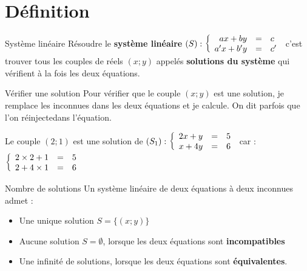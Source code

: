 \documentclass[10pt,a4paper,openany,twoside, eleve]{book}
\begin{document}
\chapnumber{} %
\entetegal{}


\vspace{-5mm}
\section{Définition}

\begin{defi}{Système linéaire}{}
Résoudre le \textbf{système linéaire} $(S) : \left\{\begin{array}{rcl} ax+by&=&c \\ a'x+b'y&=&c' \end{array}\right.$ c'est trouver tous les couples de réels $(x;y)$ appelés \textbf{solutions du système} qui vérifient à la fois les deux équations.
\end{defi}

\begin{methode}{Vérifier une solution}{}
   Pour vérifier que le couple $(x;y)$ est une solution, je remplace les inconnues dans les deux équations et je calcule. On dit parfois que l'on \og réinjecte\fg dans l'équation.
\end{methode}

\begin{ex}{}{}
   Le couple $(2;1)$ est une solution de $(S_1) : \left\{\begin{array}{rcl} 2x+y&=&5 \\ x+4y&=&6 \end{array}\right.$ car :  \quad $\left\{\begin{array}{rcl} 2\times2+1&=&5 \\ 2+4\times1&=&6 \end{array}\right.$
\end{ex}

\begin{prop}{Nombre de solutions}{}
   Un système linéaire de deux équations à deux inconnues admet :
   \begin{itemize}
      \item Une unique solution $S=\{(x;y)\}$
      \item Aucune solution $S=\emptyset$, lorsque les deux équations sont \textbf{incompatibles}
      \item Une infinité de solutions, lorsque les deux équations sont \textbf{équivalentes}.
   \end{itemize}
\end{prop}
\end{document}
